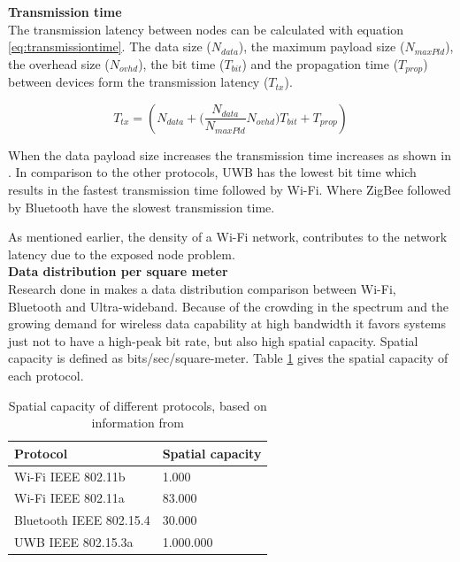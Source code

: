 \documentclass[10pt,a4paper]{article}
\begin{document}
\textbf{Transmission time}\\
The transmission latency between nodes can be calculated with equation \ref{eq:transmissiontime}.\cite{comparitivestudywirelessprotocols} The data size ($N_{data}$), the maximum payload size ($N_{maxPld}$), the overhead size ($N_{ovhd}$), the bit time ($T_{bit}$) and the propagation time ($T_{prop}$) between devices form the transmission latency ($T_{tx}$). 

\begin{equation}
    T_{tx}=(N_{data} + \Bigg(\frac{N_{data}}{N_{maxPld}} N_{ovhd} \Bigg) T_{bit} + T_{prop})
    \label{eq:transmissiontime}
\end{equation}

When the data payload size increases the transmission time increases as shown in \cite{comparitivestudywirelessprotocols}. In comparison to the other protocols, UWB has the lowest bit time which results in the fastest transmission time followed by Wi-Fi. Where ZigBee followed by Bluetooth have the slowest transmission time.

As mentioned earlier, the density of a Wi-Fi network, contributes to the network latency due to the exposed node problem.\cite{combook} \\

\textbf{Data distribution per square meter}\\
Research done in \cite{ultrawidebandshortmediumrange} makes a data distribution comparison between Wi-Fi, Bluetooth and Ultra-wideband. Because of the crowding in the spectrum and the growing demand for wireless data capability at high bandwidth it favors systems just not to have a high-peak bit rate, but also high spatial capacity. Spatial capacity is defined as bits/sec/square-meter. \cite{ultrawidebandshortmediumrange} Table \ref{spatialcapacity} gives the spatial capacity of each protocol.

\begin{table}[H]
\centering
\caption{Spatial capacity of different protocols, based on information from \cite{ultrawidebandshortmediumrange}}
\label{spatialcapacity}
\begin{tabular}{|l|l|}
\hline
\textbf{Protocol}  & \textbf{Spatial capacity} \\ \hline
Wi-Fi IEEE 802.11b & 1.000                     \\ \hline
Wi-Fi IEEE 802.11a & 83.000                    \\ \hline
Bluetooth IEEE 802.15.4          & 30.000                    \\ \hline
UWB IEEE 802.15.3a                & 1.000.000                 \\ \hline
\end{tabular}
\end{table}
\end{document}
